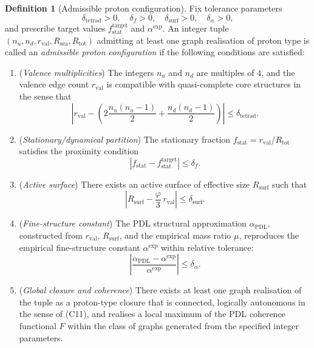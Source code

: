 \documentclass[11pt,a4paper]{article}
\theoremstyle{definition}
\newtheorem{definition}[theorem]{Definition}
\newcommand{\PDL}{\mathrm{PDL}}
\begin{document}
\begin{definition}[Admissible proton configuration]
\label{def:admissible_config}
Fix tolerance parameters
\[
 \delta_{\mathrm{tetrad}}>0,\quad
 \delta_f>0,\quad
 \delta_{\mathrm{surf}}>0,\quad
 \delta_{\alpha}>0,
\]
and prescribe target values $f_{\mathrm{stat}}^{\mathrm{target}}$ and $\alpha^{\mathrm{exp}}$. An integer tuple $(n_u,n_d,r_{\mathrm{val}},R_{\mathrm{sea}},R_{\mathrm{tot}})$ admitting at least one graph realisation of proton type is called an \emph{admissible proton configuration} if the following conditions are satisfied:
\begin{enumerate}
  \item[(A1)] (\emph{Valence multiplicities}) The integers $n_u$ and $n_d$ are multiples of $4$, and the valence edge count $r_{\mathrm{val}}$ is compatible with quasi-complete core structures in the sense that
  \[
   \left|r_{\mathrm{val}} - \left(2\frac{n_u(n_u-1)}{2} + \frac{n_d(n_d-1)}{2}\right)\right| \leq \delta_{\mathrm{tetrad}}.
  \]
  \item[(A2)] (\emph{Stationary/dynamical partition}) The stationary fraction $f_{\mathrm{stat}} = r_{\mathrm{val}}/R_{\mathrm{tot}}$ satisfies the proximity condition
  \[
   \left|f_{\mathrm{stat}} - f_{\mathrm{stat}}^{\mathrm{target}}\right| \leq \delta_f.
  \]
  \item[(A3)] (\emph{Active surface}) There exists an active surface of effective size $R_{\mathrm{surf}}$ such that
  \[
   \left| R_{\mathrm{surf}} - \frac{\varphi}{3}\, r_{\mathrm{val}} \right| \leq \delta_{\mathrm{surf}}.
  \]
  \item[(A4)] (\emph{Fine-structure constant}) The PDL structural approximation $\alpha_{\PDL}$, constructed from $r_{\mathrm{val}}$, $R_{\mathrm{surf}}$, and the empirical mass ratio $\mu$, reproduces the empirical fine-structure constant $\alpha^{\mathrm{exp}}$ within relative tolerance:
  \[
   \left|\frac{\alpha_{\PDL} - \alpha^{\mathrm{exp}}}{\alpha^{\mathrm{exp}}}\right| \leq \delta_{\alpha}.
  \]
  \item[(A5)] (\emph{Global closure and coherence}) There exists at least one graph realisation of the tuple as a proton-type closure that is connected, logically autonomous in the sense of (C11), and realises a local maximum of the PDL coherence functional $F$ within the class of graphs generated from the specified integer parameters.\cite{PDL_Main_2026,Combinatorial_Proton_v2_2026,PDL_Global_Mapping_2026}
\end{enumerate}
\end{definition}
\end{document}
